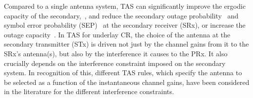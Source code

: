 \documentclass[12pt,draftcls,peerreview,onecolumn]{IEEEtran}
\begin{document}
Compared to a single antenna system, TAS can significantly improve the ergodic capacity of the secondary,~\cite{Hanif_2015_globecom,Wang_2010_TWC}, and reduce the secondary outage probability~\cite{Kong_2011_JCN} and symbol error probability (SEP)~\cite{Sarvendranath_2013_TCOM,Sarvendranath_2014_TCOM} at the secondary receiver (SRx), or increase the outage capacity~\cite{Kong_2011_JCN}. In TAS for underlay CR, the choice of the antenna at the secondary transmitter (STx) is driven not just by the channel gains from it to the SRx's antenna(s), but also by the interference it causes to the PRx. It also crucially depends on the interference constraint imposed on the secondary system. In recognition of this, different TAS rules, which specify the antenna to be selected as a function of the instantaneous channel gains, have been considered in the literature for the different interference constraints. 
%
\end{document}
